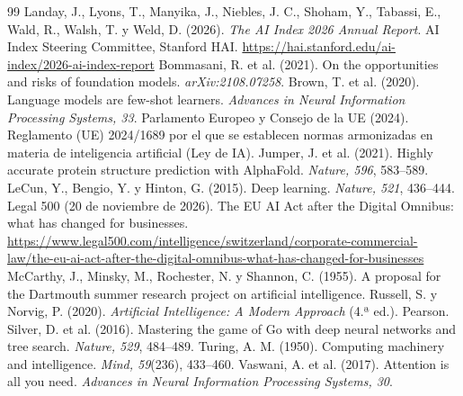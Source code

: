 \documentclass[11pt,a4paper]{article}
\begin{document}
\begin{thebibliography}{99}
 Landay, J., Lyons, T., Manyika, J., Niebles, J. C., Shoham, Y., Tabassi, E., Wald, R., Walsh, T. y Weld, D. (2026). \emph{The AI Index 2026 Annual Report}. AI Index Steering Committee, Stanford HAI. \url{https://hai.stanford.edu/ai-index/2026-ai-index-report}
 Bommasani, R. et al. (2021). On the opportunities and risks of foundation models. \emph{arXiv:2108.07258}.
 Brown, T. et al. (2020). Language models are few-shot learners. \emph{Advances in Neural Information Processing Systems, 33}.
 Parlamento Europeo y Consejo de la UE (2024). Reglamento (UE) 2024/1689 por el que se establecen normas armonizadas en materia de inteligencia artificial (Ley de IA).
 Jumper, J. et al. (2021). Highly accurate protein structure prediction with AlphaFold. \emph{Nature, 596}, 583--589.
 LeCun, Y., Bengio, Y. y Hinton, G. (2015). Deep learning. \emph{Nature, 521}, 436--444.
 Legal 500 (20 de noviembre de 2026). The EU AI Act after the Digital Omnibus: what has changed for businesses. \url{https://www.legal500.com/intelligence/switzerland/corporate-commercial-law/the-eu-ai-act-after-the-digital-omnibus-what-has-changed-for-businesses}
 McCarthy, J., Minsky, M., Rochester, N. y Shannon, C. (1955). A proposal for the Dartmouth summer research project on artificial intelligence.
 Russell, S. y Norvig, P. (2020). \emph{Artificial Intelligence: A Modern Approach} (4.ª ed.). Pearson.
 Silver, D. et al. (2016). Mastering the game of Go with deep neural networks and tree search. \emph{Nature, 529}, 484--489.
 Turing, A. M. (1950). Computing machinery and intelligence. \emph{Mind, 59}(236), 433--460.
 Vaswani, A. et al. (2017). Attention is all you need. \emph{Advances in Neural Information Processing Systems, 30}.
\end{thebibliography}
\end{document}
